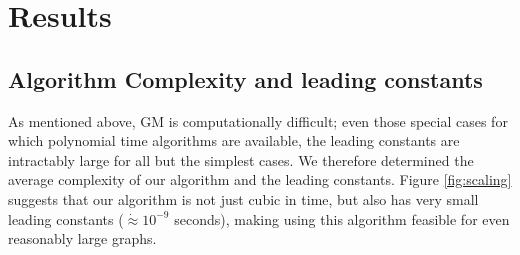 \documentclass[10pt,journal,cspaper,compsoc]{IEEEtran}
\begin{document}
\section{Results} %
\label{sec:theoretical_results}





\subsection{Algorithm Complexity and leading constants} %
\label{sub:algorithm_complexity_and_leading_constants}

As mentioned above, GM is computationally difficult; even those special cases for which polynomial time algorithms are available, the leading constants are intractably large for all but the simplest cases. We therefore determined the average complexity of our algorithm and the leading constants.  Figure \ref{fig:scaling} suggests that our algorithm is not just cubic in time, but also has very small leading constants ($\dot{\approx} 10^{-9}$ seconds), making using this algorithm feasible for even reasonably large graphs.
\end{document}
